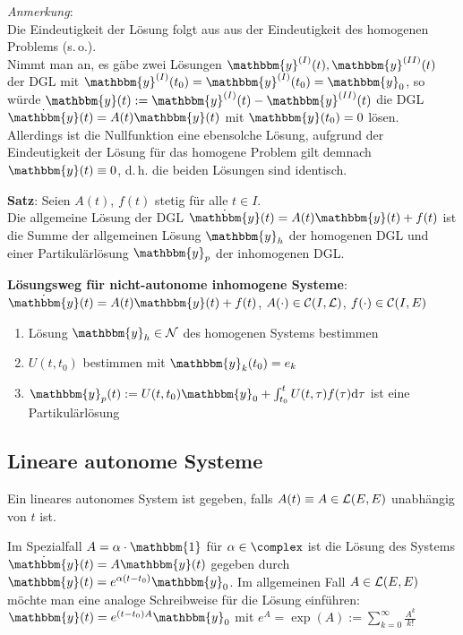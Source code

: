 \emph{Anmerkung}: \\
Die Eindeutigkeit der Lösung folgt aus aus der Eindeutigkeit des homogenen
Problems (s.\,o.). \\
Nimmt man an, es gäbe zwei Lösungen
$\mathbbm{y}^{(I)}(t), \mathbbm{y}^{(II)}(t)$ der DGL mit
$\mathbbm{y}^{(I)}(t_0) = \mathbbm{y}^{(I)}(t_0) = \mathbbm{y}_0$,
so würde $\mathbbm{y}(t) := \mathbbm{y}^{(I)}(t) - \mathbbm{y}^{(II)}(t)$
die DGL $\dot{\mathbbm{y}}(t) = A(t) \mathbbm{y}(t)$ mit
$\mathbbm{y}(t_0) = 0$ lösen.
Allerdings ist die Nullfunktion eine ebensolche Lösung, aufgrund der
Eindeutigkeit der Lösung für das homogene Problem
gilt demnach $\mathbbm{y}(t) \equiv 0$, d.\,h.
die beiden Lösungen sind identisch.

\textbf{Satz}:
Seien $A(t)$, $f(t)$ stetig für alle $t \in I$. \\
Die allgemeine Lösung der DGL
$\dot{\mathbbm{y}}(t) = A(t) \mathbbm{y}(t) + f(t)$ ist die Summe
der allgemeinen Lösung $\mathbbm{y}_h$ der homogenen DGL
und einer Partikulärlösung $\mathbbm{y}_p$ der inhomogenen DGL.

\linie

\textbf{Lösungsweg für nicht-autonome inhomogene Systeme}: \\
$\dot{\mathbbm{y}}(t) = A(t) \mathbbm{y}(t) + f(t)$,
$A(\cdot) \in \mathcal{C}(I, \mathcal{L})$, $f(\cdot) \in \mathcal{C}(I, E)$
\begin{enumerate}
    \item
    Lösung $\mathbbm{y}_h \in \mathcal{N}$ des homogenen Systems bestimmen

    \item
    $U(t, t_0)$ bestimmen mit $\mathbbm{y}_k(t_0) = e_k$

    \item
    $\mathbbm{y}_p(t) := U(t, t_0) \mathbbm{y}_0 +
    \int_{t_0}^t U(t, \tau) f(\tau) \d\tau$
    ist eine Partikulärlösung
\end{enumerate}

\subsection{%
    Lineare autonome Systeme%
}

Ein lineares autonomes System ist gegeben, falls $A(t) \equiv A \in \mathcal{L}(E, E)$
unabhängig von $t$ ist.

Im Spezialfall $A = \alpha \cdot \mathbbm{1}$ für $\alpha \in \complex$ ist
die Lösung des Systems $\dot{\mathbbm{y}}(t) = A \mathbbm{y}(t)$ gegeben durch
$\mathbbm{y}(t) = e^{\alpha (t - t_0)} \mathbbm{y}_0$.
Im allgemeinen Fall $A \in \mathcal{L}(E, E)$ möchte man eine analoge Schreibweise
für die Lösung einführen:
$\mathbbm{y}(t) = e^{(t - t_0) A} \mathbbm{y}_0$ mit
$e^A = \exp(A) := \sum_{k=0}^\infty \frac{A^k}{k!}$

